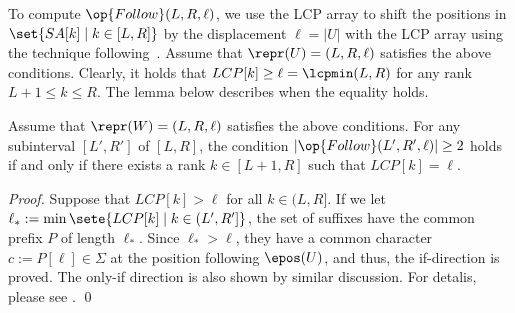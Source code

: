 
  To compute $\op{Follow}(L, R, \ell)$, we use the LCP array to shift the positions in $\set{SA[k] \mid k \in [L, R]}$ by the displacement $\ell = |U|$  with the LCP array using the technique following~\cite{abouelhoda2004replacing,ohlebusch2013bookbioinfo}.
Assume that $\repr(U) = (L, R, \ell)$ satisfies the above conditions. Clearly, it holds that $LCP[k] \ge \ell = \lcpmin(L, R)$ for any rank $L+1 \le k\le R$. The lemma below describes when the equality holds. 

\begin{lemmarep}
\label{lemold:child:interval:chara}
Assume that $\repr(W) = (L, R, \ell)$ satisfies the above conditions.
For any subinterval $[L', R']$ of $[L,R]$, 
the condition $|\op{Follow}(L', R', \ell)| \ge 2$ holds if and only if 
there exists a rank $k \in [L+1, R]$ such that $LCP[k] = \ell$. 
\end{lemmarep}

\begin{proof}
Suppose that $LCP[k] > \ell$ for all $k \in (L, R]$.
If we let $\ell_* := \min\sete{ LCP[k] \mid k \in (L',R'] }$, the set of suffixes have the common prefix $P$ of length $\ell_*$. Since $\ell_* > \ell$, they have a common character $c := P[\ell] \in \Sigma$ at the position following $\epos(U)$, and thus, the if-direction is proved. The only-if direction is also shown by similar discussion. For detalis, please see \cite[Lemma~4.3.5]{ohlebusch2013bookbioinfo}.
\qed
\end{proof}


